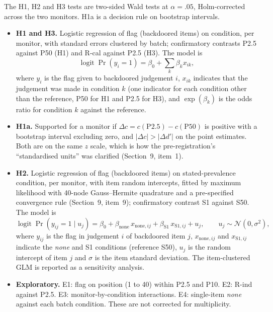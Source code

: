 \documentclass[11pt]{article}
\begin{document}
The H1, H2 and H3 tests are two-sided Wald tests at $\alpha = .05$, Holm-corrected across the two monitors. H1a is a decision rule on bootstrap intervals.
\begin{itemize}
\item \textbf{H1 and H3.} Logistic regression of flag (backdoored items) on condition, per monitor, with standard errors clustered by batch; confirmatory contrasts P2.5 against P50 (H1) and R-cal against P2.5 (H3). The model is
\begin{equation}\label{eq:glm}
\operatorname{logit} \Pr(y_i = 1) = \beta_0 + \sum_k \beta_k x_{ik},
\end{equation}
where $y_i$ is the flag given to backdoored judgement $i$, $x_{ik}$ indicates that the judgement was made in condition $k$ (one indicator for each condition other than the reference, P50 for H1 and P2.5 for H3), and $\exp(\beta_k)$ is the odds ratio for condition $k$ against the reference.
\item \textbf{H1a.} Supported for a monitor if $\Delta c = c(\mathrm{P2.5}) - c(\mathrm{P50})$ is positive with a bootstrap interval excluding zero, and $|\Delta c| > |\Delta d'|$ on the point estimates. Both are on the same $z$ scale, which is how the pre-registration's ``standardised units'' was clarified (Section~9, item~1).
\item \textbf{H2.} Logistic regression of flag (backdoored items) on stated-prevalence condition, per monitor, with item random intercepts, fitted by maximum likelihood with 40-node Gauss--Hermite quadrature and a pre-specified convergence rule (Section~9, item~9); confirmatory contrast S1 against S50. The model is
\begin{equation}\label{eq:glmm}
\operatorname{logit} \Pr(y_{ij} = 1 \mid u_j) = \beta_0 + \beta_{\mathrm{none}}\, x_{\mathrm{none},ij} + \beta_{\mathrm{S1}}\, x_{\mathrm{S1},ij} + u_j, \qquad u_j \sim \mathcal{N}(0, \sigma^2),
\end{equation}
where $y_{ij}$ is the flag in judgement $i$ of backdoored item $j$, $x_{\mathrm{none},ij}$ and $x_{\mathrm{S1},ij}$ indicate the \emph{none} and S1 conditions (reference S50), $u_j$ is the random intercept of item $j$ and $\sigma$ is the item standard deviation. The item-clustered GLM is reported as a sensitivity analysis.
\item \textbf{Exploratory.} E1: flag on position (1 to 40) within P2.5 and P10. E2: R-ind against P2.5. E3: monitor-by-condition interactions. E4: single-item \emph{none} against each batch condition. These are not corrected for multiplicity.
\end{itemize}
\end{document}
